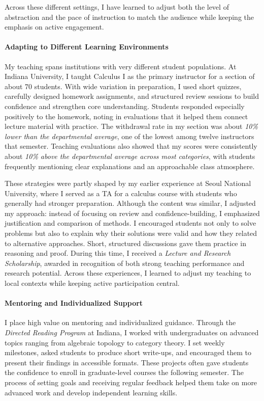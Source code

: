 \documentclass[11pt]{article}
\begin{document}
Across these different settings, I have learned to adjust both the level of abstraction and the pace of instruction to match the audience while keeping the emphasis on active engagement.

\paragraph{Adapting to Different Learning Environments} \quad 

My teaching spans institutions with very different student populations.
At Indiana University, I taught Calculus I as the primary instructor for a section of about 70 students.
With wide variation in preparation, I used short quizzes, carefully designed homework assignments, and structured review sessions to build confidence and strengthen core understanding.
Students responded especially positively to the homework, noting in evaluations that it helped them connect lecture material with practice.
The withdrawal rate in my section was about \emph{10\% lower than the departmental average}, one of the lowest among twelve instructors that semester. Teaching evaluations also showed that my scores were consistently about \emph{10\% above the departmental average across most categories}, with students frequently mentioning clear explanations and an approachable class atmosphere.

These strategies were partly shaped by my earlier experience at Seoul National University, where I served as a TA for a calculus course with students who generally had stronger preparation. 
Although the content was similar, I adjusted my approach: instead of focusing on review and confidence-building, I emphasized justification and comparison of methods. 
I encouraged students not only to solve problems but also to explain why their solutions were valid and how they related to alternative approaches. 
Short, structured discussions gave them practice in reasoning and proof.
During this time, I received a \emph{Lecture and Research Scholarship}, awarded in recognition of both strong teaching performance and research potential.
Across these experiences, I learned to adjust my teaching to local contexts while keeping active participation central.


\paragraph{Mentoring and Individualized Support}\quad 

I place high value on mentoring and individualized guidance.
Through the \emph{Directed Reading Program} at Indiana, I worked with undergraduates on advanced topics ranging from algebraic topology to category theory.
I set weekly milestones, asked students to produce short write-ups, and encouraged them to present their findings in accessible formats.
These projects often gave students the confidence to enroll in graduate-level courses the following semester.
The process of setting goals and receiving regular feedback helped them take on more advanced work and develop independent learning skills.
\end{document}
